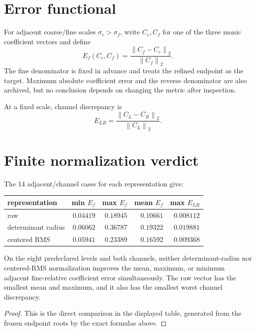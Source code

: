\documentclass[12pt]{article}
\theoremstyle{remark}\newtheorem{remark}[theorem]{Remark}
\newcommand{\norm}[1]{\left\lVert#1\right\rVert}
\begin{document}
\section{Error functional}

For adjacent coarse/fine scales $\sigma_c>\sigma_f$, write $C_c,C_f$ for
one of the three monic coefficient vectors and define
\begin{equation}\label{eq:error}
 E_f(C_c,C_f)=\frac{\norm{C_f-C_c}_2}{\norm{C_f}_2}.
\end{equation}
The fine denominator is fixed in advance and treats the refined endpoint as
the target.  Maximum absolute coefficient error and the reverse denominator
are also archived, but no conclusion depends on changing the metric after
inspection.

At a fixed scale, channel discrepancy is
\begin{equation}\label{eq:channelerror}
 E_{LR}=\frac{\norm{C_L-C_R}_2}{\norm{C_L}_2}.
\end{equation}

\section{Finite normalization verdict}

The 14 adjacent/channel cases for each representation give:
\begin{center}
\begin{tabular}{lrrrr}
\toprule
representation & min $E_f$ & max $E_f$ & mean $E_f$ & max $E_{LR}$\\
\midrule
raw & $0.04419$ & $0.18945$ & $0.10661$ & $0.008112$\\
determinant radius & $0.06062$ & $0.36787$ & $0.19322$ & $0.019881$\\
centered RMS & $0.05941$ & $0.23389$ & $0.16592$ & $0.009368$\\
\bottomrule
\end{tabular}
\end{center}

\begin{proposition}\label{prop:negative}
On the eight predeclared levels and both channels, neither determinant-radius
nor centered-RMS normalization improves the mean, maximum, or minimum
adjacent fine-relative coefficient error simultaneously.  The raw vector has
the smallest mean and maximum, and it also has the smallest worst channel
discrepancy.
\end{proposition}
\begin{proof}
This is the direct comparison in the displayed table, generated from the
frozen endpoint roots by the exact formulas above.
\end{proof}
\end{document}
